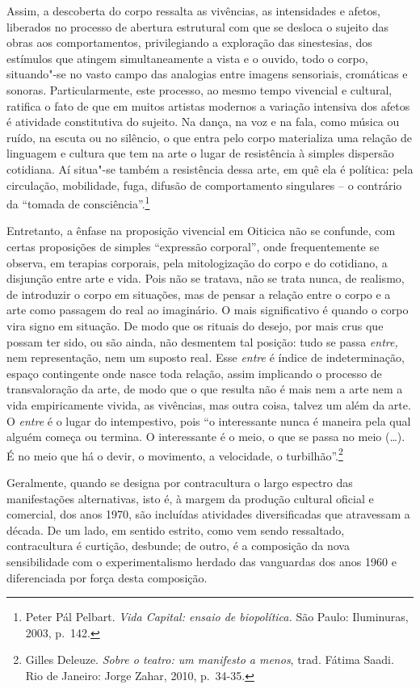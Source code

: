 Assim, a descoberta do corpo ressalta as vivências, as intensidades e
afetos, liberados no processo de abertura estrutural com que se desloca
o sujeito das obras aos comportamentos, privilegiando a exploração das
sinestesias, dos estímulos que atingem simultaneamente a vista e o
ouvido, todo o corpo, situando"-se no vasto campo das analogias entre
imagens sensoriais, cromáticas e sonoras. Particularmente, este
processo, ao mesmo tempo vivencial e cultural, ratifica o fato de que em
muitos artistas modernos a variação intensiva dos afetos é atividade
constitutiva do sujeito. Na dança, na voz e na fala, como música ou
ruído, na escuta ou no silêncio, o que entra pelo corpo materializa uma
relação de linguagem e cultura que tem na arte o lugar de resistência à
simples dispersão cotidiana. Aí situa"-se também a resistência dessa
arte, em quê ela é política: pela circulação, mobilidade, fuga, difusão
de comportamento singulares -- o contrário da ``tomada de
consciência''.\footnote{Peter Pál Pelbart. \emph{Vida Capital: ensaio de
  biopolítica.} São Paulo: Iluminuras, 2003, p.~142.}

Entretanto, a ênfase na proposição vivencial em Oiticica não se
confunde, com certas proposições de simples ``expressão corporal'', onde
frequentemente se observa, em terapias corporais, pela mitologização do
corpo e do cotidiano, a disjunção entre arte e vida. Pois não se
tratava, não se trata nunca, de realismo, de introduzir o corpo em
situações, mas de pensar a relação entre o corpo e a arte como passagem
do real ao imaginário. O mais significativo é quando o corpo vira signo
em situação. De modo que os rituais do desejo, por mais crus que possam
ter sido, ou são ainda, não desmentem tal posição: tudo se passa
\emph{entre,} nem representação, nem um suposto real\emph{.} Esse
\emph{entre} é índice de indeterminação, espaço contingente onde nasce
toda relação, assim implicando o processo de transvaloração da arte, de
modo que o que resulta não é mais nem a arte nem a vida empiricamente
vivida, as vivências, mas outra coisa, talvez um além da arte. O
\emph{entre} é o lugar do intempestivo, pois ``o interessante nunca é
maneira pela qual alguém começa ou termina. O interessante é o meio, o
que se passa no meio (\ldots{}). É no meio que há o devir, o movimento, a
velocidade, o turbilhão''.\footnote{Gilles Deleuze. \emph{Sobre o
  teatro: um manifesto a menos}, trad. Fátima Saadi. Rio de Janeiro:
  Jorge Zahar, 2010, p.~34-35.}

\asterisc

Geralmente, quando se designa por contracultura o largo espectro das
manifestações alternativas, isto é, à margem da produção cultural
oficial e comercial, dos anos 1970, são incluídas atividades
diversificadas que atravessam a década. De um lado, em sentido estrito,
como vem sendo ressaltado, contracultura é curtição, desbunde; de outro,
é a composição da nova sensibilidade com o experimentalismo herdado das
vanguardas dos anos 1960 e diferenciada por força desta composição.

